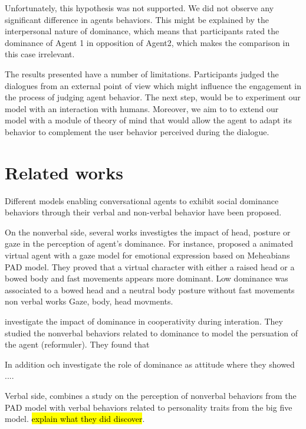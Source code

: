 \documentclass{llncs}
\begin{document}
			 Unfortunately, this hypothesis was not supported. We did not observe any significant difference in agents behaviors. This might be explained by the interpersonal nature of dominance, which means that participants rated the dominance of Agent 1 in opposition of Agent2, which makes the comparison in this case irrelevant. 
			 
			 \par  The results presented have a number of limitations. Participants judged the dialogues from an external point of view which might influence the engagement in the process of judging agent behavior. The next step, would be to experiment our model with an interaction with humans. Moreover, we aim to to extend our model with a module of theory of mind that would allow the agent to adapt its behavior to complement the user behavior perceived during the dialogue.
	
			 \section{Related works}
				Different models enabling conversational agents to exhibit social dominance behaviors through their verbal and non-verbal behavior have been proposed. 
				
				On the nonverbal side,  several works investigtes the impact of head, posture or gaze in the perception of agent's dominance. For instance, \cite{lance2008relation}  proposed a animated virtual agent with a gaze model for emotional expression based on Meheabians PAD model. They proved that a virtual character with either a raised head or a				bowed body and fast movements appears more dominant. Low dominance was associated  to a bowed head and a neutral body posture without fast movements	non verbal works Gaze, body, head movments.
				
				\cite{mignault2003many}
				
				
				
				\par \cite{strassmann2016effect} investigate the impact of dominance in cooperativity during interation. They studied the nonverbal behaviors related to dominance to model the persuation of the agent (reformuler).
				They found that 
				
				\par In addition och investigate the role of dominance as attitude where they showed ....
				
				Verbal side, \cite{bee2010bossy} combines a study on the perception of nonverbal behaviors from the PAD model with verbal behaviors related to personality traits from the big five model. \hl{explain what they did discover}.
				
\end{document}
